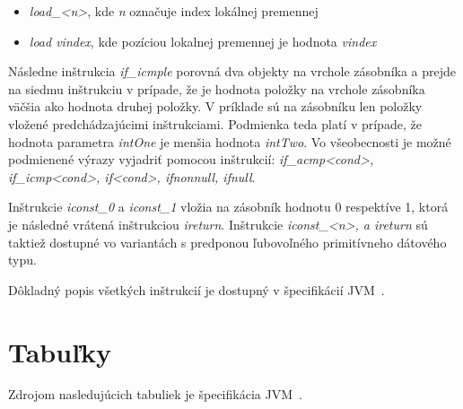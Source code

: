 \documentclass[11pt,final,oneside]{fithesis}
\begin{document}
\begin{itemize}
\item \textit{load\_<n>}, kde \textit{n} označuje index lokálnej premennej
\item \textit{load vindex}, kde pozíciou lokalnej premennej je hodnota
\textit{vindex}
\end{itemize}

Následne inštrukcia \textit{if\_icmple} porovná dva objekty na vrchole 
zásobníka a prejde na siedmu inštrukciu v prípade, že je hodnota položky na 
vrchole zásobníka väčšia ako hodnota druhej položky. V príklade sú na zásobníku 
len položky vložené predchádzajúcimi inštrukciami. Podmienka teda platí v 
prípade, že hodnota parametra \textit{intOne} je menšia hodnota \textit{intTwo}.
Vo všeobecnosti je možné podmienené výrazy vyjadriť pomocou inštrukcií:
\textit{if\_acmp<cond>, if\_icmp<cond>, if<cond>, ifnonnull, ifnull}.

Inštrukcie \textit{iconst\_0} a \textit{iconst\_1} vložia na zásobník hodnotu 0
respektíve 1, ktorá je následné vrátená inštrukciou \textit{ireturn}. Inštrukcie
\textit{iconst\_<n>, a ireturn} sú taktiež dostupné vo variantách s predponou 
ľubovoľného primitívneho dátového typu.

Dôkladný popis všetkých inštrukcií je
dostupný v špecifikácií JVM~\cite{Lindholm:2013:JVM:2462629}.

\clearpage
{} 
 
 

\appendix

\chapter{Tabuľky}
Zdrojom nasledujúcich tabuliek je špecifikácia
JVM~\cite{Lindholm:2013:JVM:2462629}.
\end{document}
